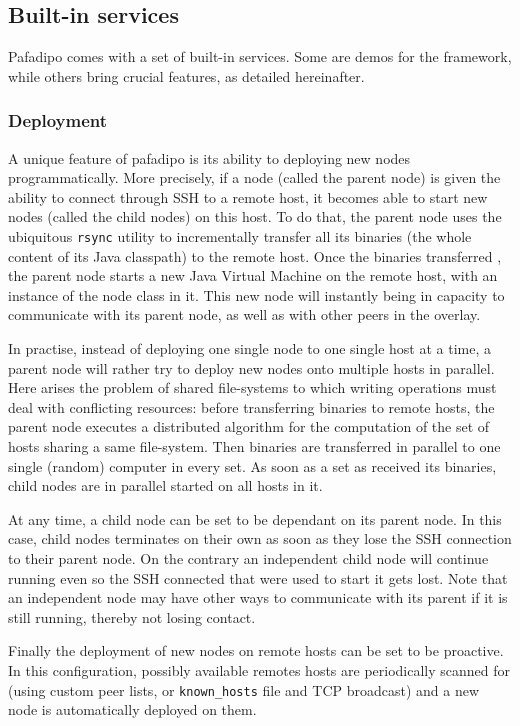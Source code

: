 \documentclass{article}
\begin{document}
\subsection{Built-in services}
Pafadipo comes with a set of built-in services. Some are demos for the framework, while others bring crucial features, as detailed hereinafter.

\subsubsection{Deployment}
A unique feature of pafadipo is its ability to deploying new nodes programmatically.
More precisely, if a node (called the parent node) is given the ability to connect through SSH to a remote host, it becomes able to start new nodes (called the child nodes) on this host.
To do that, the parent node uses the ubiquitous \texttt{rsync} utility to incrementally transfer all its binaries (the whole content of its Java classpath) to the remote host. Once the binaries transferred , the parent node starts a new Java Virtual Machine on the remote host, with an instance of the node class in it. This new node will instantly being in capacity to communicate with its parent node, as well as with other peers in the overlay.

In practise, instead of deploying one single node to one single host at a time, a parent node will rather try to deploy new nodes onto multiple hosts in parallel. Here arises the problem of shared file-systems to which writing operations must deal with  conflicting resources: before transferring binaries to remote hosts, the parent node executes a distributed algorithm for the computation of the set of hosts sharing a same file-system. Then binaries are transferred in parallel to one single (random) computer in every set. As soon as a set as received its binaries, child nodes are in parallel  started on all hosts in it.

At any time, a child node can be set to be dependant on its parent node. In this case, child nodes terminates on their own as soon as they lose the SSH connection to their parent node. On the contrary an independent child node will continue running even so the SSH connected that were used to start it gets lost. Note that an independent node may have other ways to communicate with its parent if it is still running, thereby not losing contact.

Finally the deployment of new nodes on remote hosts can be set to be proactive. In this configuration, possibly available remotes hosts are periodically scanned for (using custom peer lists, or \texttt{known_hosts} file and TCP broadcast) and a new node is automatically deployed on them.
\end{document}
